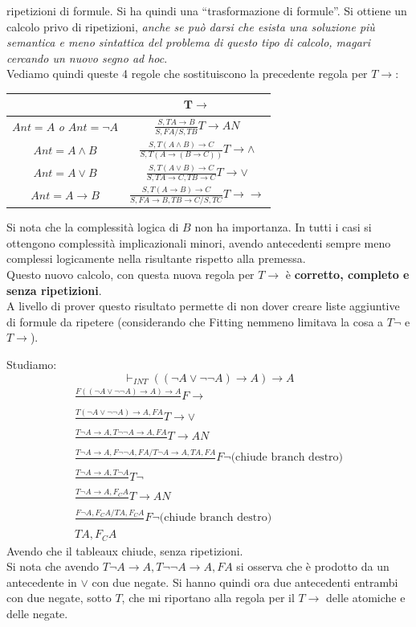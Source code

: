 \documentclass[a4paper,12pt, oneside]{book}
\begin{document}
ripetizioni di formule. Si ha quindi una ``trasformazione di formule''. Si
ottiene un calcolo privo di ripetizioni,\textit{ anche se può darsi che esista
  una soluzione più semantica e meno sintattica del problema di questo tipo di
  calcolo, magari cercando un nuovo segno ad hoc}. \\
Vediamo quindi queste 4 regole che sostituiscono la precedente regola per
$T\to$: 
\begin{table}[H]
  \Large
  \centering
  \begin{tabular}{c|c}
    & $\mathbf{T\to}$\\
    \hline
    $Ant=A$ \textit{o} $Ant=\neg A$ & $\frac{S,TA\to B}{S,FA/S,TB}T\to AN$\\
    \hline
    $Ant=A\land B $ & $\frac{S,T(A\land B)\to C}{S,T(A\to(B\to C))}T\to \land$\\
    \hline
    $Ant=A\lor B$ & $\frac{S,T(A\lor B)\to C}{S,TA\to C, TB\to C}T\to \lor$\\
    \hline
    $Ant =A\to B$ & $\frac{S,T(A\to B)\to C}{S, FA\to B, TB\to C/S, TC}T\to \to$\\
    \hline
  \end{tabular}
\end{table}
Si nota che la complessità logica di $B$ non ha importanza. In tutti i casi si
ottengono complessità implicazionali minori, avendo antecedenti sempre meno
complessi logicamente nella risultante rispetto alla premessa.\\
Questo nuovo calcolo, con questa nuova regola per $T\to$ è \textbf{corretto,
  completo e senza ripetizioni}.\\
A livello di prover questo risultato permette di non dover creare liste
aggiuntive di formule da ripetere (considerando che Fitting nemmeno limitava la
cosa a $T\neg $ e $T\to$).
\begin{esempio}
  Studiamo:
  \[\vdash_{INT} ((\neg A\lor \neg \neg A)\to A)\to A\]
  \begin{gather*}
    \frac{F ((\neg A\lor \neg \neg A)\to A)\to A}{}F\to\\
    \frac{T(\neg A\lor \neg \neg A)\to A, FA}{}T\to\lor\\ 
    \frac{T\neg A\to A, T\neg\neg A\to A,FA}{}T\to AN\\
    \frac{T\neg A\to A, F\neg\neg A, FA/T\neg A\to A, TA,FA}{}F\neg\mbox{(chiude
      branch destro)}\\ 
    \frac{T\neg A\to A,T\neg A}{}T\neg\\
    \frac{T\neg A\to A,F_C A}{}T\to AN\\
    \frac{F\neg A, F_CA/TA,F_CA}{}F\neg\mbox{(chiude branch destro)}\\
    TA, F_CA
  \end{gather*}
  Avendo che il tableaux chiude, senza ripetizioni.\\
  Si nota che avendo $T\neg A\to A, T\neg\neg A\to A,FA$ si osserva che è
  prodotto da un antecedente in $\lor$ con due negate. Si hanno quindi ora due
  antecedenti entrambi con due negate, sotto $T$, che mi riportano alla regola
  per il $T\to$ delle atomiche e delle negate.
\end{esempio}
\end{document}
